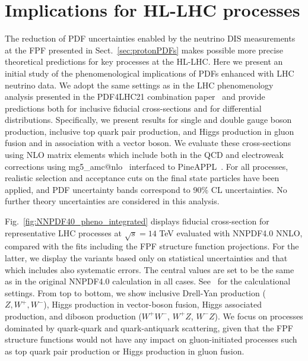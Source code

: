 \clearpage
\section{Implications for HL-LHC processes}
\label{sec:pheno}

The reduction of PDF uncertainties enabled by the neutrino DIS measurements
at the FPF presented in Sect.~\ref{sec:protonPDFs}
makes possible more precise theoretical predictions for key processes at the
HL-LHC.
%
Here we present an initial study of the phenomenological implications
of PDFs enhanced with LHC neutrino data.
%
We adopt the same settings as in the LHC phenomenology analysis presented
in the PDF4LHC21 combination paper~\cite{PDF4LHCWorkingGroup:2022cjn} and provide predictions
both for inclusive fiducial cross-sections and for differential distributions.
%
Specifically, we present results for 
single and double gauge boson production, inclusive top quark pair production,
and Higgs production in gluon
fusion and in association with a vector boson.
%
We evaluate these cross-sections using NLO matrix elements
which include  both in the
QCD and electroweak corrections using
{\sc\small mg5\_amc@nlo}~\cite{Frederix:2018nkq}
interfaced to {\sc\small PineAPPL}~\cite{Carrazza:2020gss}.
%
For all processes, realistic selection and acceptance cuts on the final state particles
have been applied, and PDF uncertainty bands correspond to 90\% CL
uncertainties.
%
No further theory uncertainties are considered in this
analysis.

Fig.~\ref{fig:NNPDF40_pheno_integrated} displays
fiducial cross-section for representative LHC processes at $\sqrt{s}=14$ TeV
evaluated with NNPDF4.0 NNLO, compared with the fits including the FPF structure function projections.
%
For the latter, we display the variants based only on statistical uncertainties and that
which includes also systematic errors.
%
The central values are set to be the same as in the original NNPDF4.0 calculation in all cases.
%
See~\cite{NNPDF:2021njg} for the calculational settings.
%
From top to bottom, we show inclusive Drell-Yan production ($Z, W^+, W^-$), Higgs production
in vector-boson fusion, Higgs associated
production, and diboson production ($W^+W^-$, $W^+Z$, $W^-Z$).
%
We focus on processes dominated by quark-quark and quark-antiquark scattering, given
that the FPF structure functions would not have any impact on gluon-initiated
processes such as top quark pair production or Higgs production in gluon fusion.


